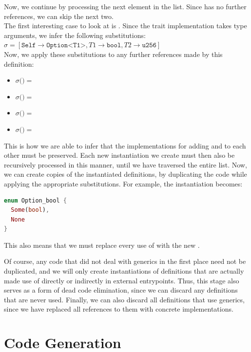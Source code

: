 Now, we continue by processing the next element in the list. Since  has no further references, we can skip the next two. \\
The first interesting case to look at is . Since the trait implementation takes type arguments, we infer the following substitutions: $\sigma = [\texttt{Self} \to \texttt{Option<T1>}, T1 \to \texttt{bool}, T2 \to \texttt{u256}]$ \\
Now, we apply these substitutions to any further references made by this definition:
\begin{itemize}
  \item $\sigma($$) = $ 
  \item $\sigma($$) = $ 
  \item $\sigma($$) = $ 
  \item $\sigma($$) = $ 
\end{itemize}
This is how we are able to infer that the implementations for adding  and  to each other must be preserved. Each new instantiation we create must then also be recursively processed in this manner, until we have traversed the entire list. Now, we can create copies of the instantiated definitions, by duplicating the code while applying the appropriate substitutions. For example, the instantiation  becomes:
\begin{lstlisting}[language=Rust, style=boxed]
enum Option_bool {
  Some(bool),
  None
}
\end{lstlisting}
This also means that we must replace every use of  with the new .
\par
Of course, any code that did not deal with generics in the first place need not be duplicated, and we will only create instantiations of definitions that are actually made use of directly or indirectly in external entrypoints. Thus, this stage also serves as a form of dead code elimination, since we can discard any definitions that are never used. Finally, we can also discard all definitions that use generics, since we have replaced all references to them with concrete implementations.

\section{Code Generation}

